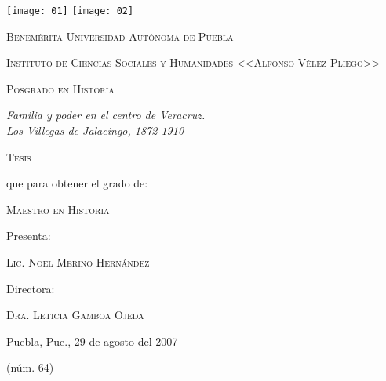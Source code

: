 \documentclass[14pt,twoside,final]{extbook} %
\begin{document}
\setcounter{page}{1}
\parindent=5mm %
\parskip=0mm %
\newpage
\thispagestyle{empty}
\begin{center}
\begin{minipage}{11cm}
\texttt{[image: 01]}\label{fig:buap} \hfill \texttt{[image: 02]}
\label{fig:icsyh}
\end{minipage}
\end{center}
\smallskip
\begin{center}
\large\scshape Benemérita Universidad Autónoma de Puebla
\end{center}
\begin{center}
\large\scshape Instituto de Ciencias Sociales y Humanidades <<Alfonso Vélez Pliego>> 
\end{center}
\begin{center}
\large\scshape Posgrado en Historia
\end{center}
\bigskip
\begin{center}
\Large\itshape Familia y poder en el centro de Veracruz. \\ Los Villegas de Jalacingo, 1872-1910
\end{center}
\bigskip
\begin{center}
\Large\scshape Tesis
\end{center}
\bigskip
\begin{center}
que para obtener el grado de:
\end{center}
\begin{center}
\scshape Maestro en Historia
\end{center}
\begin{center}
Presenta:
\end{center}
\begin{center}
\scshape Lic. Noel Merino Hernández
\end{center}
\begin{center}
Directora:
\end{center}
\begin{center}
\scshape Dra. Leticia Gamboa Ojeda
\end{center}
\medskip
\begin{center}
Puebla, Pue., 29 de agosto del 2007
\end{center}
\begin{center}
(núm. 64)
\end{center}
\clearpage
\end{document}
